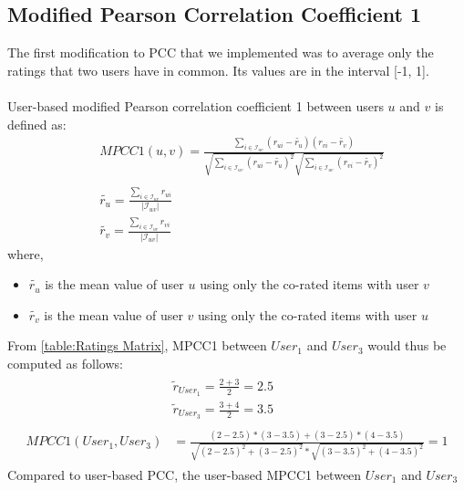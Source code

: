 \subsection{Modified Pearson Correlation Coefficient 1}
The first modification to PCC that we implemented was to average only the ratings that
two users have in common. Its values are in the interval [-1, 1].\\\\
User-based modified Pearson correlation coefficient 1 between users $u$ and $v$ is defined as:
\begin{equation}\label{eq:pearson_1}
\begin{split}
    &MPCC1(u,v) = \frac{\sum_{i \in \mathcal{I}_{uv}}(r_{ui}-\tilde{r_{u}})(r_{vi}-\tilde{r_{v}})}
                       {\sqrt{\sum_{i \in \mathcal{I}_{uv}}(r_{ui}-\tilde{r_{u}})^2}
                        \sqrt{\sum_{i \in \mathcal{I}_{uv}}(r_{vi}-\tilde{r_{v}})^2}} \\\\
    &\tilde{r_{u}} = \frac{\sum_{i \in \mathcal{I}_{uv}}r_{ui}}
                          {\mathopen|\mathcal{I}_{uv}\mathclose|}\\
    &\tilde{r_{v}} = \frac{\sum_{i \in \mathcal{I}_{uv}}r_{vi}}
                          {\mathopen|\mathcal{I}_{uv}\mathclose|}
\end{split}
\end{equation}
where,
\begin{itemize}
	\item[] $\tilde{r_u}$ is the mean value of user $u$ using only the co-rated items with user $v$
	\item[] $\tilde{r_v}$ is the mean value of user $v$ using only the co-rated items with user $u$
\end{itemize}
From \autoref{table:Ratings Matrix}, MPCC1
between $User_1$ and $User_3$ would thus be computed as follows:
\begin{align*}
	\begin{split}
		&\tilde{r}_{User_1} = \frac{2 + 3}{2} = 2.5\\
		&\tilde{r}_{User_3} = \frac{3 + 4}{2} = 3.5\\\\
		MPCC1(User_1,User_3) &= \frac{(2 - 2.5) * (3 - 3.5) + (3 - 2.5) * (4 - 3.5)}
								  {\sqrt{(2 - 2.5)^2 + (3 - 2.5)^2} *
								   \sqrt{(3 - 3.5)^2 + (4 - 3.5)^2}} = 1
	\end{split}
\end{align*}
Compared to user-based PCC, the user-based MPCC1 between $User_1$ and $User_3$
